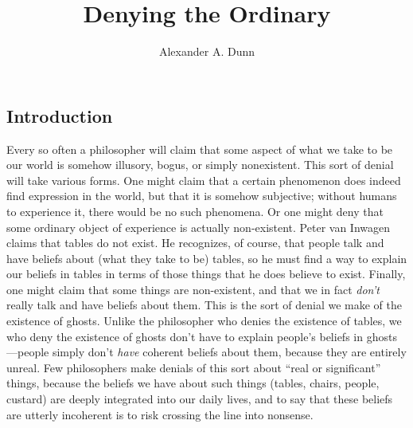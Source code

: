 \documentclass[11pt]{article}
\title{Denying the Ordinary}
\author{Alexander A. Dunn}
\newenvironment{inq}{\vspace{0pt}%
	\begin{list}{}%
	{\setlength\labelwidth{0pt}%
	\setlength\leftmargin{2.5\oddsidemargin}%
	\setlength\rightmargin{\leftmargin}}
	\begin{spacing}{1}
	\item[]%
	}{
	\end{spacing}
	\end{list}
	\vspace{10pt}
	}
\begin{document}
\ifstandalone
\maketitle
\tableofcontents
\begin{spacing}{1.5}
\fi



\section{Introduction}
\label{intro-deny}
\noindent Every so often a philosopher will claim that some aspect of what we take to be our world is somehow illusory, bogus, or simply nonexistent. This sort of denial will take various forms. One might claim that a certain phenomenon does indeed find expression in the world, but that it is somehow subjective; without humans to experience it, there would be no such phenomena. Or one might deny that some ordinary object of experience is actually non-existent. Peter van Inwagen claims that tables do not exist. He recognizes, of course, that people talk and have beliefs about (what they take to be) tables, so he must find a way to explain our beliefs in tables in terms of those things that he does believe to exist. Finally, one might claim that some things are non-existent, and that we in fact {\em don't} really talk and have beliefs about them. This is the sort of denial we make of the existence of ghosts. Unlike the philosopher who denies the existence of tables, we who deny the existence of ghosts don't have to explain people's beliefs in ghosts---people simply don't {\em have} coherent beliefs about them, because they are entirely unreal. Few philosophers make denials of this sort about ``real or significant'' things, because the beliefs we have about such things (tables, chairs, people, custard) are deeply integrated into our daily lives, and to say that these beliefs are utterly incoherent is to risk crossing the line into nonsense.


\end{spacing}
\end{document}
